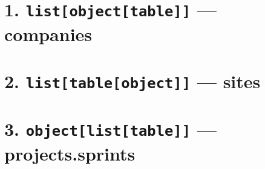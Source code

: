 \setlength{\parindent}{0pt}
\newcommand\itemBullet[1]{\textbullet\ #1\quad}

\section*{1. \texttt{list[object[table]]} --- companies}

\newcommand\employeeRow{\name & \role \\}
\newcommand\companyRow{%
    \subsection*{\company}
    \begin{tabular}{l|l}
        \textbf{Name} & \textbf{Role} \\\hline
        \fortablerow{employees}{employeeRow}
    \end{tabular}\par
}

\section*{2. \texttt{list[table[object]]} --- sites}

\newcommand\contactRow{\key & \paramfield{contact}{name} & \paramfield{contact}{email} \\}
\newcommand\siteBlock{%
    \begin{tabular}{l|l|l}
        \textbf{Key} & \textbf{Contact} & \textbf{Email} \\\hline
        \fortablerow{self}{contactRow}
    \end{tabular}\par\medskip
}

\section*{3. \texttt{object[list[table]]} --- projects.sprints}

